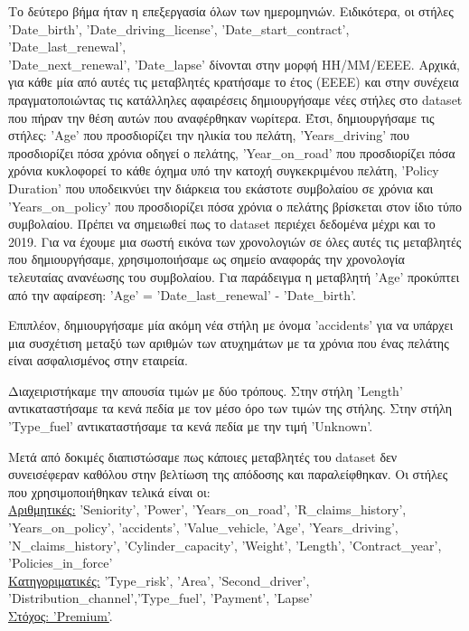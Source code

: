 \documentclass{llncs}
\begin{document}
Το δεύτερο βήμα ήταν η επεξεργασία όλων των ημερομηνιών. Ειδικότερα, οι στήλες 'Date\_birth', 'Date\_driving\_license', 'Date\_start\_contract', 'Date\_last\_renewal', \\
'Date\_next\_renewal', 'Date\_lapse' δίνονται στην μορφή ΗΗ/ΜΜ/ΕΕΕΕ. Αρχικά, για κάθε μία από αυτές τις μεταβλητές κρατήσαμε το έτος (ΕΕΕΕ) και στην συνέχεια πραγματοποιώντας τις κατάλληλες αφαιρέσεις
δημιουργήσαμε νέες στήλες στο dataset που πήραν την θέση αυτών που αναφέρθηκαν νωρίτερα. Έτσι, δημιουργήσαμε τις στήλες: 'Age' που προσδιορίζει την ηλικία του πελάτη, 'Years\_driving' που προσδιορίζει 
πόσα χρόνια οδηγεί ο πελάτης, 'Year\_on\_road' που προσδιορίζει πόσα χρόνια κυκλοφορεί το κάθε όχημα υπό την κατοχή συγκεκριμένου πελάτη, 'Policy Duration' που υποδεικνύει την διάρκεια του εκάστοτε συμβολαίου σε χρόνια και 
'Years\_on\_policy' που προσδιορίζει πόσα χρόνια ο πελάτης βρίσκεται στον ίδιο τύπο συμβολαίου. Πρέπει να σημειωθεί πως το dataset περιέχει δεδομένα μέχρι και το 2019. Για να έχουμε μια σωστή εικόνα των χρονολογιών
σε όλες αυτές τις μεταβλητές που δημιουργήσαμε, χρησιμοποιήσαμε ως σημείο αναφοράς την χρονολογία τελευταίας ανανέωσης του συμβολαίου. Για παράδειγμα η μεταβλητή 'Age' προκύπτει από την αφαίρεση:
'Age' = 'Date\_last\_renewal' - 'Date\_birth'.

Επιπλέον, δημιουργήσαμε μία ακόμη νέα στήλη με όνομα 'accidents' για να υπάρχει μια συσχέτιση μεταξύ των αριθμών των ατυχημάτων με τα χρόνια που ένας πελάτης είναι ασφαλισμένος στην εταιρεία.

Διαχειριστήκαμε την απουσία τιμών με δύο τρόπους. Στην στήλη 'Length' αντικαταστήσαμε τα κενά πεδία με τον μέσο όρο των τιμών της στήλης. Στην στήλη 'Type\_fuel' αντικαταστήσαμε τα κενά πεδία με την τιμή 
'Unknown'.

Μετά από δοκιμές διαπιστώσαμε πως κάποιες μεταβλητές του dataset δεν συνεισέφεραν καθόλου στην βελτίωση της απόδοσης και παραλείφθηκαν. 
Οι στήλες που χρησιμοποιήθηκαν τελικά είναι οι:\\
\underline{Αριθμητικές:} 'Seniority', 'Power', 'Years\_on\_road', 'R\_claims\_history', 'Years\_on\_policy', 
'accidents', 'Value\_vehicle, 'Age', 'Years\_driving', 'N\_claims\_history', 'Cylinder\_capacity', 
'Weight', 'Length', 'Contract\_year', 'Policies\_in\_force'
\\\underline{Κατηγοριματικές:} 'Type\_risk', 'Area', 'Second\_driver', 'Distribution\_channel','Type\_fuel', 'Payment', 'Lapse'
\\\underline{Στόχος: 'Premium'}.
\end{document}
